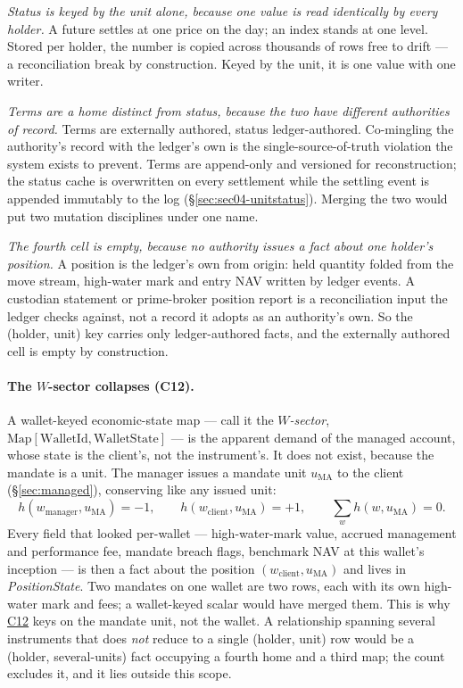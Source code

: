 \emph{Status is keyed by the unit alone, because one value is read identically by every
holder.} A future settles at one price on the day; an index stands at one level. Stored
per holder, the number is copied across thousands of rows free to drift --- a
reconciliation break by construction. Keyed by the unit, it is one value with one writer.

\emph{Terms are a home distinct from status, because the two have different authorities of
record.} Terms are externally authored, status ledger-authored. Co-mingling the
authority's record with the ledger's own is the single-source-of-truth violation the
system exists to prevent. Terms are append-only and versioned for reconstruction; the
status cache is overwritten on every settlement while the settling event is appended
immutably to the log (\S\ref{sec:sec04-unitstatus}). Merging the two would put two
mutation disciplines under one name.

\emph{The fourth cell is empty, because no authority issues a fact about one holder's
position.} A position is the ledger's own from origin: held quantity folded from the move
stream, high-water mark and entry NAV written by ledger events. A custodian statement or
prime-broker position report is a reconciliation input the ledger checks against, not a
record it adopts as an authority's own. So the (holder, unit) key carries only
ledger-authored facts, and the externally authored cell is empty by construction.

\paragraph{The $W$-sector collapses (C12).}
A wallet-keyed economic-state map --- call it the \emph{$W$-sector},
$\mathrm{Map}[\mathrm{WalletId},\mathrm{WalletState}]$ --- is the apparent demand of the
managed account, whose state is the client's, not the instrument's. It does not exist,
because the mandate is a unit. The manager issues a mandate unit $u_{\mathrm{MA}}$ to the
client (\S\ref{sec:managed}), conserving like any issued unit:
\[
h(w_{\mathrm{manager}},u_{\mathrm{MA}})=-1,\qquad
h(w_{\mathrm{client}},u_{\mathrm{MA}})=+1,\qquad
\sum_{w}h(w,u_{\mathrm{MA}})=0 .
\]
Every field that looked per-wallet --- high-water-mark value, accrued management and
performance fee, mandate breach flags, benchmark NAV at this wallet's inception --- is then
a fact about the position $(w_{\mathrm{client}},u_{\mathrm{MA}})$ and lives in
\emph{PositionState}. Two mandates on one wallet are two rows, each with its own
high-water mark and fees; a wallet-keyed scalar would have merged them. This is why
\hyperref[cond:C12]{C12} keys on the mandate unit, not the wallet. A relationship spanning
several instruments that does \emph{not} reduce to a single (holder, unit) row would be a
(holder, several-units) fact occupying a fourth home and a third map; the count excludes
it, and it lies outside this scope.

